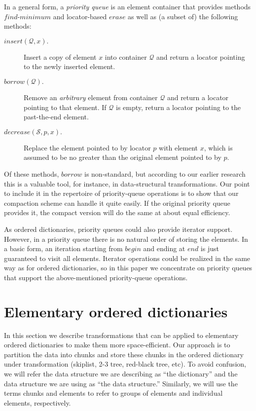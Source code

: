 \documentclass{DIKU-article}
\newcommand{\Erase}{\mbox{$\mathit{erase}$}}
\newcommand{\Findmin}{\mbox{$\mathit{find}$\textnormal{-}}\allowbreak{}\mbox{$\mathit{minimum}$}}
\newcommand{\Insert}{\mbox{$\mathit{insert}$}}
\newcommand{\Decrease}{\mbox{$\mathit{decrease}$}}
\newcommand{\Begin}{\mbox{$\mathit{begin}$}}
\newcommand{\End}{\mbox{$\mathit{end}$}}
\newcommand{\Borrow}{\mbox{$\mathit{borrow}$}}
\newcommand{\seclabel}[1]{\label{sec:#1}}
\begin{document}
In a general form, a \emph{priority queue} is an element container
that provides methods \Findmin{} and locator-based \Erase{} as well as (a
subset of) the following methods:
\begin{description}
\item[\Insert{}$(\mathcal{Q}, x).$] Insert a copy of element $x$ into
container $\mathcal{Q}$ and return a locator pointing to the newly inserted
element.

\item[\Borrow{}$(\mathcal{Q}).$] Remove an \emph{arbitrary} element from
container $\mathcal{Q}$ and return a locator pointing to that element. If $\mathcal{Q}$
is empty, return a locator pointing to the past-the-end element.

\item[\Decrease{}$(\mathcal{S}, p, x).$] Replace the element pointed to by
locator $p$ with element $x$, which is assumed to be no greater than
the original element pointed to by $p$.
\end{description}
Of these methods, \Borrow{} is non-standard, but according to our
earlier research \cite{EJK04,EJK07} this is a valuable tool, for
instance, in data-structural transformations. Our point to include it
in the repertoire of priority-queue operations is to show that our
compaction scheme can handle it quite easily. If the original priority
queue provides it, the compact version will do the same at about equal
efficiency.

As ordered dictionaries, priority queues could also provide iterator
support. However, in a priority queue there is no natural order of
storing the elements. In a basic form, an iteration starting from
\Begin{} and ending at \End{} is just guaranteed to visit all
elements. Iterator operations could be realized in the same way as for
ordered dictionaries, so in this paper we concentrate on priority
queues that support the above-mentioned priority-queue
operations.

\section{Elementary ordered dictionaries}%
\seclabel{elementary-dictionaries}


In this section we describe transformations that can be applied to
elementary ordered dictionaries to make them more space-efficient.
Our approach is to partition the data into chunks and store these
chunks in the ordered dictionary under transformation (skiplist,
2-3 tree, red-black tree, etc).  To avoid confusion, we will refer the
data structure we are describing as ``the dictionary'' and the data
structure we are using as ``the data structure.''  Similarly, we will
use the terms chunks and elements to refer to groups of elements and
individual elements, respectively.  
\end{document}
